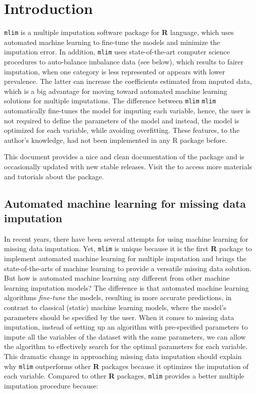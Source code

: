 \section{Introduction}

\texttt{mlim} is a multiple imputation software package for \textbf{R} language, which uses automated machine learning to fine-tune the models and minimize the imputation error. In addition, \texttt{mlim} uses state-of-the-art computer science procedures to auto-balance imbalance data (see below), which results to fairer imputation, when one category is less represented or appears with lower prevalence. The latter can increase the coefficients estimated from imputed data, which is a big advantage for moving toward automated machine learning solutions for multiple imputations. The difference between \texttt{mlim} \texttt{mlim} automatically fine-tunes the model for imputing each variable, hence, the user is not required to define the parameters of the model and instead, the model is optimized for each variable, while avoiding overfitting. These features, to the author's knowledge, had not been implemented in any R package before. 

This document provides a nice and clean documentation of the package and is occasionally updated with new stable releases. Visit the  to access more materials and tutorials about the package.



\subsection{Automated machine learning for missing data imputation}

In recent years, there have been several attempts for using machine learning for missing data imputation. Yet, \texttt{mlim} is unique because it is the first \textbf{R} package to implement automated machine learning for multiple imputation and brings the state-of-the-arts of machine learning to provide a versatile missing data solution. But how is automated machine learning any different from other machine learning imputation models? The difference is that automated machine learning algorithms \textit{fine-tune} the models, resulting in more accurate predictions, in contrast to classical (static) machine learning models, where the model's parameters should be specified by the user. When it comes to missing data imputation, instead of setting up an algorithm with pre-specified parameters to impute all the variables of the dataset with the same parameters, we can allow the algorithm to effectively search for the optimal parameters for each variable. This dramatic change in approaching missing data imputation should explain why \texttt{mlim} outperforms other \textbf{R} packages because it optimizes the imputation of each variable. Compared to other \textbf{R} packages, \texttt{mlim} provides a better multiple imputation procedure because: 


